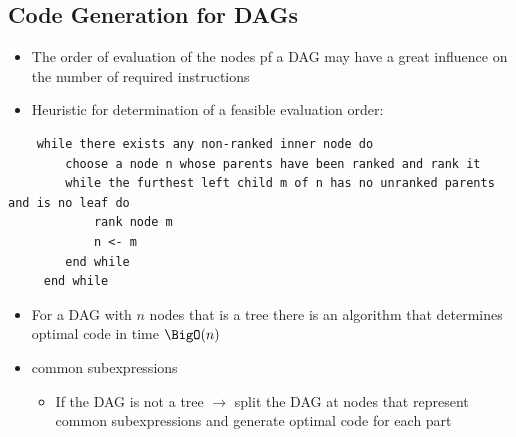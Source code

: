 \subsection{Code Generation for DAGs}
\begin{itemize}
	\item The order of evaluation of the nodes pf a DAG may have a great influence on the number of required instructions
	\item Heuristic for determination of a feasible evaluation order:
\end{itemize}
\begin{verbatim}
	while there exists any non-ranked inner node do
	    choose a node n whose parents have been ranked and rank it
	    while the furthest left child m of n has no unranked parents and is no leaf do
	        rank node m
	        n <- m
	    end while
	 end while   
\end{verbatim}  

\begin{itemize}
	\item For a DAG with $n$ nodes that is a tree there is an algorithm that determines optimal code in time $\BigO(n)$
	\item common subexpressions
\begin{itemize}
	\item If the DAG is not a tree $\rightarrow$ split the DAG at nodes that represent common subexpressions and generate optimal code for each part
\end{itemize}
\end{itemize}

